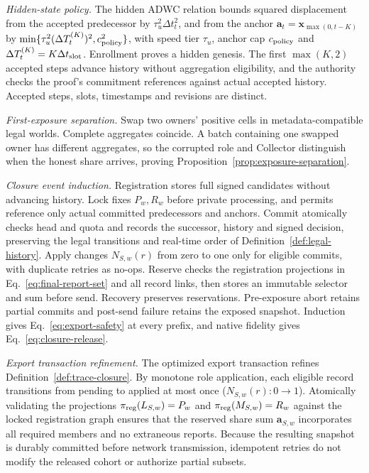 \documentclass[conference,compsoc]{IEEEtran}
\theoremstyle{definition}
\numberwithin{equation}{section}
\numberwithin{table}{section}
\numberwithin{figure}{section}
\theoremstyle{plain}
\begin{document}
\par\noindent\emph{Hidden-state policy.}
The hidden ADWC relation bounds squared displacement from the accepted
predecessor by \(\tau_u^2\Delta t_t^2\), and from the anchor
\(\mathbf a_t=\mathbf x_{\max(0,t-K)}\) by
\(\min\{\tau_u^2(\Delta T_t^{(K)})^2,c_{\rm policy}^2\}\), with speed tier
\(\tau_u\), anchor cap \(c_{\rm policy}\) and
\(\Delta T_t^{(K)}=K\Delta t_{\rm slot}\). Enrollment proves a hidden
genesis. The first \(\max(K,2)\) accepted steps advance history without
aggregation eligibility, and the authority checks the proof's commitment
references against actual accepted history. Accepted steps, slots,
timestamps and revisions are distinct.

\par\noindent\emph{First-exposure separation.}
\label{app:exposure-separation}
Swap two owners' positive cells in metadata-compatible legal worlds.
Complete aggregates coincide. A batch containing one swapped owner has
different aggregates, so the corrupted role and Collector distinguish when
the honest share arrives, proving Proposition~\ref{prop:exposure-separation}.

\par\noindent\emph{Closure event induction.}
\label{app:closure-proof}
Registration stores full signed candidates without advancing history. Lock fixes
\(P_w,R_w\) before private processing, and permits reference only actual committed
predecessors and anchors. Commit atomically checks head and quota and records
the successor, history and signed decision, preserving the legal transitions
and real-time order of Definition~\ref{def:legal-history}. Apply changes \(N_{S,w}(r)\) from zero to one
only for eligible commits, with duplicate retries as no-ops. Reserve checks
the registration projections in Eq.~\eqref{eq:final-report-set} and all record links, then stores an
immutable selector and sum before send. Recovery preserves reservations.
Pre-exposure abort retains partial commits and post-send failure retains the
exposed snapshot. Induction gives Eq.~\eqref{eq:export-safety} at every
prefix, and native fidelity gives Eq.~\eqref{eq:closure-release}.

\par\noindent\emph{Export transaction refinement.}
\label{lem:export-refinement}
The optimized export transaction refines Definition~\ref{def:trace-closure}. By monotone role application, each eligible record transitions from pending to applied at most once ($N_{S,w}(r): 0\to 1$). Atomically validating the projections $\pi_{\rm reg}(L_{S,w})=P_w$ and $\pi_{\rm reg}(M_{S,w})=R_w$ against the locked registration graph ensures that the reserved share sum $\mathbf a_{S,w}$ incorporates all required members and no extraneous reports. Because the resulting snapshot is durably committed before network transmission, idempotent retries do not modify the released cohort or authorize partial subsets.
\end{document}
